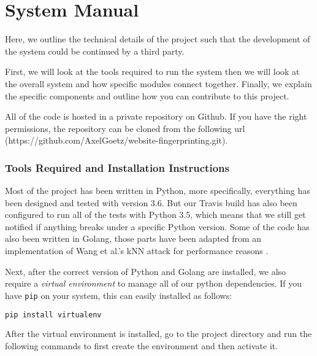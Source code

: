 \chapter{System Manual} \label{appendix:system-manual}

\begingroup

\renewcommand{\thesubsection}{\arabic{subsection}}

\renewcommand{\addcontentsline}[3]{}%

Here, we outline the technical details of the project such that the development of the system could be continued by a third party.

First, we will look at the tools required to run the system then we will look at the overall system and how specific modules connect together.
Finally, we explain the specific components and outline how you can contribute to this project.

All of the code is hosted in a private repository on Github.
If you have the right permissions, the repository can be cloned from the following url (https://github.com/AxelGoetz/website-fingerprinting.git).

\subsection{Tools Required and Installation Instructions}

Most of the project has been written in Python, more specifically, everything has been designed and tested with version 3.6.
But our Travis build has also been configured to run all of the tests with Python 3.5, which means that we still get notified if anything breaks under a specific Python version.
Some of the code has also been written in Golang, those parts have been adapted from an implementation of Wang et al.'s kNN attack for performance reasons \cite{wang_cai_johnson_nithyanand_goldberg_2014,gokNN}.

Next, after the correct version of Python and Golang are installed, we also require a \textit{virtual environment} to manage all of our python dependencies.
If you have \texttt{pip} on your system, this can easily installed as follows:

\begin{lstlisting}[language=Bash]
pip install virtualenv
\end{lstlisting}

After the virtual environment is installed, go to the project directory and run the following commands to first create the environment and then activate it.

